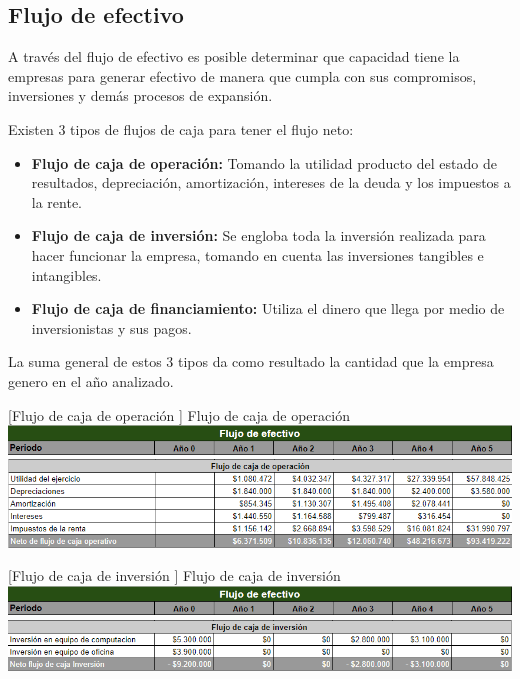 \subsection{Flujo de efectivo}

A través del flujo de efectivo es posible determinar que capacidad tiene la empresas para generar efectivo de manera que cumpla con sus compromisos, inversiones y demás procesos de expansión. 

Existen 3 tipos de flujos de caja para tener el flujo neto:

\begin{itemize}
    \item \textbf{Flujo de caja de operación: } Tomando la utilidad producto del estado de resultados, depreciación, amortización, intereses de la deuda y los impuestos a la rente.
    \item \textbf{Flujo de caja de inversión: } Se engloba toda la inversión realizada para hacer funcionar la empresa, tomando en cuenta las inversiones tangibles e intangibles.
    \item \textbf{Flujo de caja de financiamiento: } Utiliza el dinero que llega por medio de inversionistas y sus pagos.
\end{itemize}

La suma general de estos 3 tipos da como resultado la cantidad que la empresa genero en el año analizado.

\vspace{2mm}
\begin{minipage}{0.8\textwidth}
\centering
{}[{Flujo de caja de operación }]{ Flujo de caja de operación}
\label{flujoOperacional}
\includegraphics[width=1.2\textwidth]{Images/tiempo.png}
\includegraphics[width=1.2\textwidth]{Images/flujoEfectivoOperacion.png}
\end{minipage}

\vspace{2mm}
\begin{minipage}{0.8\textwidth}
\centering
{}[{Flujo de caja de inversión }]{ Flujo de caja de inversión }
\label{flujoInversion}
\includegraphics[width=1.2\textwidth]{Images/tiempo.png}
\includegraphics[width=1.2\textwidth]{Images/flujoEfectivoInversion.png}
\end{minipage}


